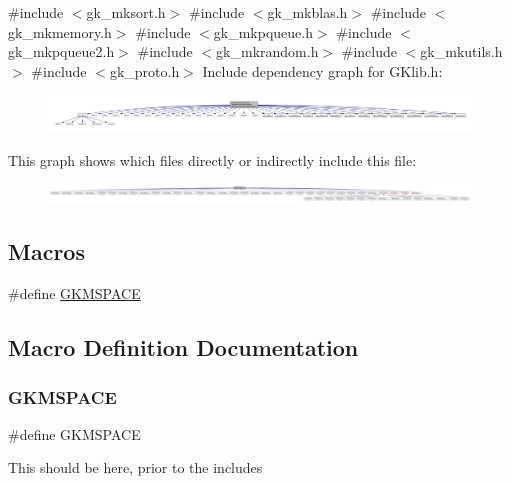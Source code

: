 {\ttfamily \#include $<$gk\+\_\+mksort.\+h$>$}\newline
{\ttfamily \#include $<$gk\+\_\+mkblas.\+h$>$}\newline
{\ttfamily \#include $<$gk\+\_\+mkmemory.\+h$>$}\newline
{\ttfamily \#include $<$gk\+\_\+mkpqueue.\+h$>$}\newline
{\ttfamily \#include $<$gk\+\_\+mkpqueue2.\+h$>$}\newline
{\ttfamily \#include $<$gk\+\_\+mkrandom.\+h$>$}\newline
{\ttfamily \#include $<$gk\+\_\+mkutils.\+h$>$}\newline
{\ttfamily \#include $<$gk\+\_\+proto.\+h$>$}\newline
Include dependency graph for G\+Klib.\+h\+:\nopagebreak
\begin{figure}[H]
\begin{center}
\leavevmode
\includegraphics[width=350pt]{a00087}
\end{center}
\end{figure}
This graph shows which files directly or indirectly include this file\+:\nopagebreak
\begin{figure}[H]
\begin{center}
\leavevmode
\includegraphics[width=350pt]{a00088}
\end{center}
\end{figure}
\subsection*{Macros}
\begin{DoxyCompactItemize}
\item 
\#define \hyperlink{a00086_a601244470a8149b8043f2e13999d945c}{G\+K\+M\+S\+P\+A\+CE}
\end{DoxyCompactItemize}


\subsection{Macro Definition Documentation}
\mbox{\label{a00086_a601244470a8149b8043f2e13999d945c}} 
\subsubsection{\texorpdfstring{G\+K\+M\+S\+P\+A\+CE}{GKMSPACE}}
{\footnotesize\ttfamily \#define G\+K\+M\+S\+P\+A\+CE}

This should be here, prior to the includes 